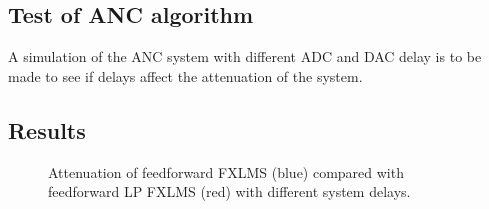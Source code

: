 \subsection{Test of ANC algorithm}
A simulation of the ANC system with different ADC and DAC delay is to be made to see if delays affect the attenuation of the system. 

\subsection{Results}

\begin{figure}[H]
	\centering
	
	\caption{Attenuation of feedforward FXLMS (blue) compared with feedforward LP FXLMS (red) with different system delays.}
	\label{Fig:delayRatioAppendix}
\end{figure}